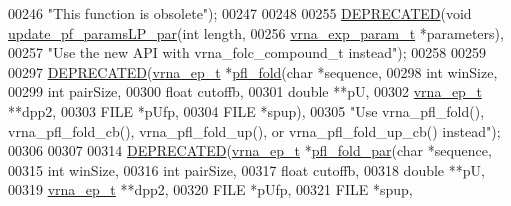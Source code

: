 \begin{DoxyCode}
00246 \textcolor{stringliteral}{"This function is obsolete"});
00247 
00248 
00255 \mbox{\hyperlink{_l_pfold_8h_aab347a3c03fbe8e7319551b9fa0cce4a}{DEPRECATED}}(\textcolor{keywordtype}{void} \mbox{\hyperlink{group__local__pf__fold_gab5aa36df48576d25cd42aea2c0bd021d}{update\_pf\_paramsLP\_par}}(\textcolor{keywordtype}{int}              length,
00256                                        \mbox{\hyperlink{group__energy__parameters_structvrna__exp__param__s}{vrna\_exp\_param\_t}} *parameters),
00257 \textcolor{stringliteral}{"Use the new API with vrna\_folc\_compound\_t instead"});
00258 
00259 
00297 \mbox{\hyperlink{_l_pfold_8h_aab347a3c03fbe8e7319551b9fa0cce4a}{DEPRECATED}}(\mbox{\hyperlink{group__struct__utils_structvrna__elem__prob__s}{vrna\_ep\_t}} *\mbox{\hyperlink{group__local__pf__fold_ga7cdf690583871f9c158a0f91d4785cb6}{pfl\_fold}}(\textcolor{keywordtype}{char}          *sequence,
00298                                \textcolor{keywordtype}{int}           winSize,
00299                                \textcolor{keywordtype}{int}           pairSize,
00300                                \textcolor{keywordtype}{float}         cutoffb,
00301                                \textcolor{keywordtype}{double}        **pU,
00302                                \mbox{\hyperlink{group__struct__utils_structvrna__elem__prob__s}{vrna\_ep\_t}}     **dpp2,
00303                                FILE          *pUfp,
00304                                FILE          *spup),
00305 \textcolor{stringliteral}{"Use vrna\_pfl\_fold(), vrna\_pfl\_fold\_cb(), vrna\_pfl\_fold\_up(), or vrna\_pfl\_fold\_up\_cb() instead"});
00306 
00307 
00314 \mbox{\hyperlink{_l_pfold_8h_aab347a3c03fbe8e7319551b9fa0cce4a}{DEPRECATED}}(\mbox{\hyperlink{group__struct__utils_structvrna__elem__prob__s}{vrna\_ep\_t}} *\mbox{\hyperlink{group__local__pf__fold_gaedf355f07b3d83bc93f98712132571b0}{pfl\_fold\_par}}(\textcolor{keywordtype}{char}              *sequence,
00315                                       \textcolor{keywordtype}{int}               winSize,
00316                                       \textcolor{keywordtype}{int}               pairSize,
00317                                       \textcolor{keywordtype}{float}             cutoffb,
00318                                       \textcolor{keywordtype}{double}            **pU,
00319                                       \mbox{\hyperlink{group__struct__utils_structvrna__elem__prob__s}{vrna\_ep\_t}}         **dpp2,
00320                                       FILE              *pUfp,
00321                                       FILE              *spup,

\end{DoxyCode}
